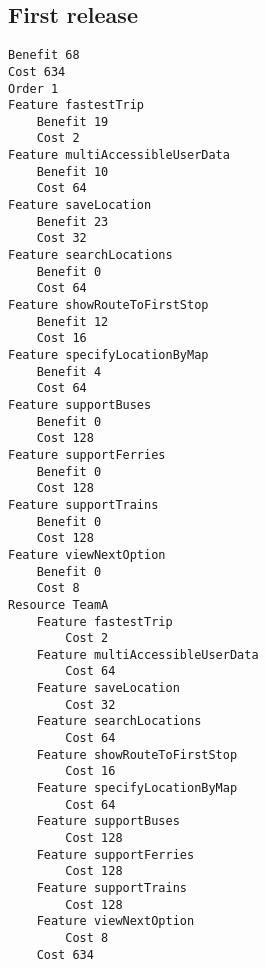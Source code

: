 \begin{lstlisting}

\end{lstlisting}


			 \subsection{First release}


\begin{lstlisting}
Benefit 68
Cost 634
Order 1
Feature fastestTrip
	Benefit 19
	Cost 2
Feature multiAccessibleUserData
	Benefit 10
	Cost 64
Feature saveLocation
	Benefit 23
	Cost 32
Feature searchLocations
	Benefit 0
	Cost 64
Feature showRouteToFirstStop
	Benefit 12
	Cost 16
Feature specifyLocationByMap
	Benefit 4
	Cost 64
Feature supportBuses
	Benefit 0
	Cost 128
Feature supportFerries
	Benefit 0
	Cost 128
Feature supportTrains
	Benefit 0
	Cost 128
Feature viewNextOption
	Benefit 0
	Cost 8
Resource TeamA
	Feature fastestTrip
		Cost 2
	Feature multiAccessibleUserData
		Cost 64
	Feature saveLocation
		Cost 32
	Feature searchLocations
		Cost 64
	Feature showRouteToFirstStop
		Cost 16
	Feature specifyLocationByMap
		Cost 64
	Feature supportBuses
		Cost 128
	Feature supportFerries
		Cost 128
	Feature supportTrains
		Cost 128
	Feature viewNextOption
		Cost 8
	Cost 634

\end{lstlisting}